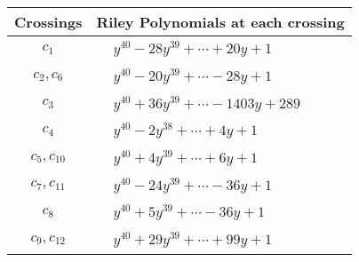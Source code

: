 \documentclass[1p]{elsarticle_modified}
\theoremstyle{definition}
\begin{document}
\begin{tabular}{m{50pt}|m{274pt}}
Crossings & \hspace{64pt}Riley Polynomials at each crossing \\
\hline $$\begin{aligned}c_{1}\end{aligned}$$&$\begin{aligned}
&y^{40}-28 y^{39}+\cdots+20 y+1
\end{aligned}$\\
\hline $$\begin{aligned}c_{2},c_{6}\end{aligned}$$&$\begin{aligned}
&y^{40}-20 y^{39}+\cdots-28 y+1
\end{aligned}$\\
\hline $$\begin{aligned}c_{3}\end{aligned}$$&$\begin{aligned}
&y^{40}+36 y^{39}+\cdots-1403 y+289
\end{aligned}$\\
\hline $$\begin{aligned}c_{4}\end{aligned}$$&$\begin{aligned}
&y^{40}-2 y^{38}+\cdots+4 y+1
\end{aligned}$\\
\hline $$\begin{aligned}c_{5},c_{10}\end{aligned}$$&$\begin{aligned}
&y^{40}+4 y^{39}+\cdots+6 y+1
\end{aligned}$\\
\hline $$\begin{aligned}c_{7},c_{11}\end{aligned}$$&$\begin{aligned}
&y^{40}-24 y^{39}+\cdots-36 y+1
\end{aligned}$\\
\hline $$\begin{aligned}c_{8}\end{aligned}$$&$\begin{aligned}
&y^{40}+5 y^{39}+\cdots-36 y+1
\end{aligned}$\\
\hline $$\begin{aligned}c_{9},c_{12}\end{aligned}$$&$\begin{aligned}
&y^{40}+29 y^{39}+\cdots+99 y+1
\end{aligned}$\\
\hline
\end{tabular}\\~\\
\end{document}
